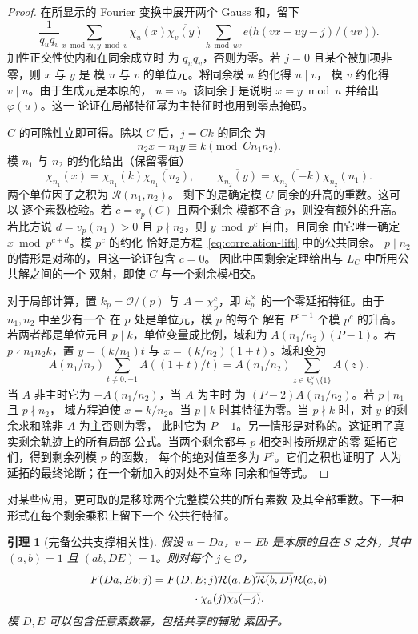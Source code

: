 \documentclass[11pt,a4paper]{article}
\numberwithin{equation}{section}
\numberwithin{figure}{section}
\newtheorem{lemma}[theorem]{引理}
\theoremstyle{definition}
\theoremstyle{remark}
\begin{document}
\begin{proof}
在所显示的 Fourier 变换中展开两个 Gauss 和，留下
\[
 \frac1{q_uq_v}\sum_{x\bmod u,y\bmod v}\chi_u(x)\overline{\chi_v(y)}
 \sum_{h\bmod uv}e\bigl(h(vx-uy-j)/(uv)\bigr).
\]
加性正交性使内和在同余成立时
为 $q_uq_v$，否则为零。若 $j=0$ 且某个被加项非零，则 $x$ 与 $y$ 是
模 $u$ 与 $v$ 的单位元。将同余模 $u$ 约化得 $u\mid v$，
模 $v$ 约化得 $v\mid u$。由于生成元是本原的，
$u=v$。该同余于是说明 $x=y\bmod u$ 并给出 $\varphi(u)$。这一
论证在局部特征幂为主特征时也用到零点掩码。

$C$ 的可除性立即可得。除以 $C$ 后，$j=Ck$ 的同余
为
\[
 n_2x-n_1y\equiv k\pmod{Cn_1n_2}.
\]
模 $n_1$ 与 $n_2$ 的约化给出（保留零值）
\[
 \chi_{n_1}(x)=\chi_{n_1}(k)\overline{\chi_{n_1}(n_2)},\qquad
 \overline{\chi_{n_2}(y)}
 =\overline{\chi_{n_2}(-k)}\chi_{n_2}(n_1).
\]
两个单位因子之积为 $\mathcal R(n_1,n_2)$。
剩下的是确定模 $C$ 同余的升高的重数。这可以
逐个素数检验。若 $c=v_p(C)$ 且两个剩余
模都不含 $p$，则没有额外的升高。若比方说
$d=v_p(n_1)>0$ 且 $p\nmid n_2$，则 $y\bmod p^c$ 自由，且同余
由它唯一确定 $x\bmod p^{c+d}$。模 $p^c$ 的约化
恰好是方程~\eqref{eq:correlation-lift} 中的公共同余。
$p\mid n_2$ 的情形是对称的，且这一论证包含 $c=0$。
因此中国剩余定理给出与 $L_C$ 中所用公共解之间的一个
双射，即使 $C$ 与一个剩余模相交。

对于局部计算，置 $k_p=\mathcal O/(p)$ 与 $A=\chi_p^c$，即
$k_p^\times$ 的一个零延拓特征。由于 $n_1,n_2$ 中至少有一个
在 $p$ 处是单位元，模 $p$ 的每个
解有 $P^{c-1}$ 个模 $p^c$ 的升高。若两者都是单位元且
$p\mid k$，单位变量成比例，域和为
$A(n_1/n_2)(P-1)$。若 $p\nmid n_1n_2k$，置
$y=(k/n_1)t$ 与 $x=(k/n_2)(1+t)$。域和变为
\[
 A(n_1/n_2)\sum_{t\ne0,-1}A((1+t)/t)
 =A(n_1/n_2)\sum_{z\in k_p^\times\setminus\{1\}}A(z).
\]
当 $A$ 非主时它为 $-A(n_1/n_2)$，当 $A$ 为主时
为 $(P-2)A(n_1/n_2)$。若 $p\mid n_1$ 且 $p\nmid n_2$，
域方程迫使 $x=k/n_2$。当 $p\mid k$ 时其特征为零。当
$p\nmid k$ 时，对 $y$ 的剩余求和除非 $A$ 为主否则为零，
此时它为 $P-1$。另一情形是对称的。这证明了真实剩余轨迹上的所有局部
公式。当两个剩余都与 $p$ 相交时按所规定的零
延拓它们，得到剩余列模 $p$ 的函数，
每个的绝对值至多为 $P^c$。它们之积也证明了
人为延拓的最终论断；在一个新加入的对处不宣称
同余和恒等式。
\end{proof}

对某些应用，更可取的是移除两个完整模公共的所有素数
及其全部重数。下一种形式在每个剩余乘积上留下一个
公共行特征。

\begin{lemma}[完备公共支撑相关性]
\label{lem:complete-support-correlation}
假设 $u=Da$，$v=Eb$ 是本原的且在 $S$ 之外，其中
$(a,b)=1$ 且 $(ab,DE)=1$。则对每个 $j\in\mathcal O$，
\begin{equation}
 \begin{split}
 F(Da,Eb;j)={}&F(D,E;j)\mathcal R(a,E)
       \overline{\mathcal R(b,D)}\mathcal R(a,b)\\
 &\hspace{8mm}\cdot\chi_a(j)\overline{\chi_b(-j)}.
 \end{split}
 \label{eq:correlation-child-character}
\end{equation}
模 $D,E$ 可以包含任意素数幂，包括共享的辅助
素因子。
\end{lemma}
\end{document}
